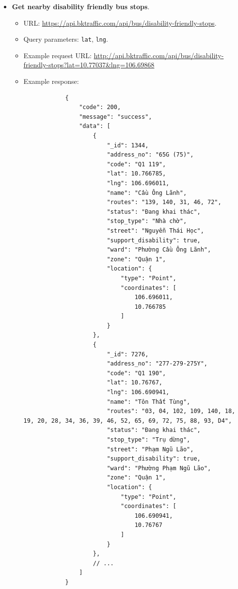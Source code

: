 \begin{itemize}
    \item \textbf{Get nearby disability friendly bus stops}.
    \begin{itemize}
        \item URL: \url{https://api.bktraffic.com/api/bus/disability-friendly-stops}.
        \item Query parameters: \lstinline{lat}, \lstinline{lng}.
        \item Example request URL: \url{http://api.bktraffic.com/api/bus/disability-friendly-stops?lat=10.77037&lng=106.69868}
        \item Example response:
        \begin{lstlisting}
            {
                "code": 200,
                "message": "success",
                "data": [
                    {
                        "_id": 1344,
                        "address_no": "65G (75)",
                        "code": "Q1 119",
                        "lat": 10.766785,
                        "lng": 106.696011,
                        "name": "Cầu Ông Lãnh",
                        "routes": "139, 140, 31, 46, 72",
                        "status": "Đang khai thác",
                        "stop_type": "Nhà chờ",
                        "street": "Nguyễn Thái Học",
                        "support_disability": true,
                        "ward": "Phường Cầu Ông Lãnh",
                        "zone": "Quận 1",
                        "location": {
                            "type": "Point",
                            "coordinates": [
                                106.696011,
                                10.766785
                            ]
                        }
                    },
                    {
                        "_id": 7276,
                        "address_no": "277-279-275Y",
                        "code": "Q1 190",
                        "lat": 10.76767,
                        "lng": 106.690941,
                        "name": "Tôn Thất Tùng",
                        "routes": "03, 04, 102, 109, 140, 18, 19, 20, 28, 34, 36, 39, 46, 52, 65, 69, 72, 75, 88, 93, D4",
                        "status": "Đang khai thác",
                        "stop_type": "Trụ dừng",
                        "street": "Phạm Ngũ Lão",
                        "support_disability": true,
                        "ward": "Phường Phạm Ngũ Lão",
                        "zone": "Quận 1",
                        "location": {
                            "type": "Point",
                            "coordinates": [
                                106.690941,
                                10.76767
                            ]
                        }
                    },
                    // ...
                ]
            }
        \end{lstlisting}
    \end{itemize}


\end{itemize}
